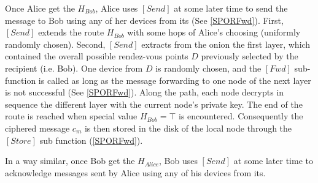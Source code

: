 
Once Alice get the \(H_{Bob}\), Alice uses \([Send]\) at some
later time to send the message to Bob using any of her devices from
its \squad (See \cref{SPORFwd}). First, \([Send]\) extends the route
\(H_{Bob}\) with some hops of Alice's choosing (uniformly randomly
chosen). Second, \([Send]\) extracts from the onion the first
layer, which contained the overall
possible rendez-vous points $D$ previously selected by the recipient (i.e. Bob).
One device from $D$ is randomly chosen, and the \([Fwd]\)
sub-function is called as long as the message forwarding to one node of
the next layer is not successful (See \cref{SPORFwd}). Along the path, each node decrypts
in sequence the different layer with the current node’s private key. 
The end of the route is reached when special value \(H_{Bob} = \top\) is
encountered. Consequently the ciphered message \(c_m\) is then stored
in the disk of the local node through the \([Store]\) sub function 
(\cref{SPORFwd}).

In a way similar, once Bob get the \(H_{Alice}\), Bob uses \([Send]\) at some
later time to acknowledge messages sent by Alice using any of his devices from
its\squad.





 

